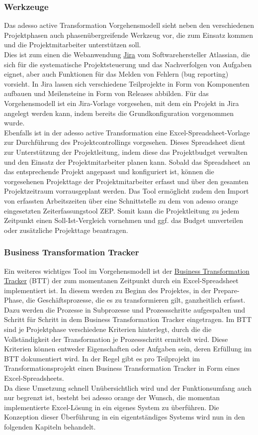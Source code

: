 \subsubsection{Werkzeuge}
Das adesso active Transformation Vorgehensmodell sieht neben den verschiedenen Projektphasen auch phasenübergreifende Werkzeug vor, die zum Einsatz kommen und die Projektmitarbeiter unterstützen soll. \\Dies ist zum einen die Webanwendung \underline{\glqq{}Jira\grqq{}} vom Softwarehersteller Atlassian, die sich für die systematische Projektsteuerung und das Nachverfolgen von Aufgaben eignet, aber auch Funktionen für das Melden von Fehlern (bug reporting) vorsieht. In Jira lassen sich verschiedene Teilprojekte in Form von Komponenten aufbauen und Meilensteine in Form von Releases abbilden. Für das Vorgehensmodell ist ein Jira-Vorlage vorgesehen, mit dem ein Projekt in Jira angelegt werden kann, indem bereits die Grundkonfiguration vorgenommen wurde.\\
Ebenfalls ist in der adesso active Transformation eine Excel-Spreadsheet-Vorlage zur Durchführung des Projektcontrollings vorgesehen. Dieses Spreadsheet dient zur Unterstützung der Projektleitung, indem diese das Projektbudget verwalten und den Einsatz der Projektmitarbeiter planen kann. Sobald das Spreadsheet an das entsprechende Projekt angepasst und konfiguriert ist, können die vorgesehenen Projekttage der Projektmitarbeiter erfasst und über den gesamten Projektzeitraum vorrausgeplant werden.  
Das Tool ermöglicht zudem den Import von erfassten Arbeitszeiten über eine Schnittstelle zu dem von adesso orange eingesetzten Zeiterfassungstool \glqq{}ZEP\grqq{}. Somit kann die Projektleitung zu jedem Zeitpunkt einen Soll-Ist-Vergleich vornehmen und ggf. das Budget umverteilen oder zusätzliche Projekttage beantragen.

\subsubsection{Business Transformation Tracker}
Ein weiteres wichtiges Tool im Vorgehensmodell ist der \underline{\glqq{}Business Transformation Tracker\grqq{}} (BTT) der zum momentanen Zeitpunkt durch ein Excel-Spreadsheet implementiert ist. In diesem werden zu Beginn des Projektes, in der Prepare-Phase, die Geschäftsprozesse, die es zu transformieren gilt, ganzheitlich erfasst. Dazu werden die Prozesse in Subprozesse und Prozessschritte aufgespalten und Schritt für Schritt in dem Business Transformation Tracker eingetragen. Im BTT sind je Projektphase verschiedene Kriterien hinterlegt, durch die die Vollständigkeit der Transformation je Prozessschritt ermittelt wird. Diese Kriterien können entweder Eigenschaften oder Aufgaben sein, deren Erfüllung im BTT dokumentiert wird. In der Regel gibt es pro Teilprojekt im Transformationsprojekt einen Business Transformation Tracker in Form eines Excel-Spreadsheets.\\
Da diese Umsetzung schnell Unübersichtlich wird und der Funktionsumfang auch nur begrenzt ist, besteht bei adesso orange der Wunsch, die momentan implementierte Excel-Lösung in ein eigenes System zu überführen. Die Konzeption dieser Überführung in ein eigentständiges Systems wird nun in den folgenden Kapiteln behandelt.
